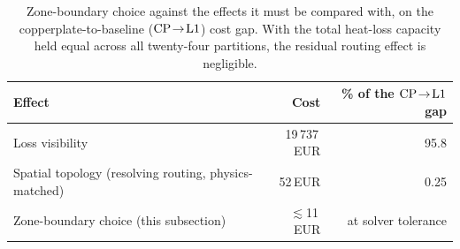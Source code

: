 \begin{table}[htbp]
\centering
\footnotesize
\caption{Zone-boundary choice against the effects it must be compared with, on the
copperplate-to-baseline ($\mathrm{CP}\!\to\!\mathrm{L1}$) cost gap. With the total heat-loss capacity held
equal across all twenty-four partitions, the residual routing effect is negligible.}
\label{tab:r16}
\begin{tabular}{lrr}
\hline
Effect & Cost & \% of the $\mathrm{CP}\!\to\!\mathrm{L1}$ gap \\
\hline
Loss visibility & 19\,737\,EUR & 95.8 \\
Spatial topology (resolving routing, physics-matched) & 52\,EUR & 0.25 \\
Zone-boundary choice (this subsection) & $\lesssim$11\,EUR & at solver tolerance \\
\hline
\end{tabular}
\end{table}
